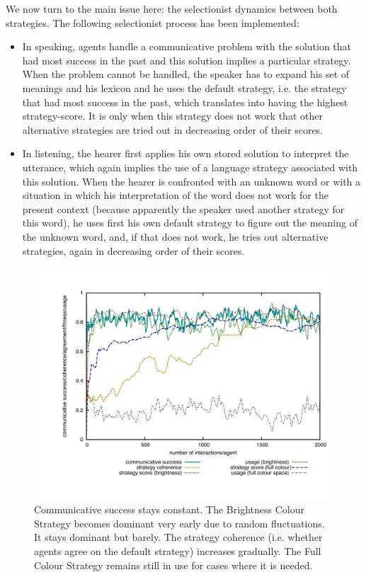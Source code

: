 We now turn to the main issue here: the
selectionist dynamics between both strategies. The following selectionist process has been implemented: 
\begin{itemize}
\item In speaking, agents handle a communicative problem with the solution 
that had most success in the past and this solution implies a particular strategy. 
When the problem cannot be handled, the speaker 
has to expand his set of meanings and his lexicon and he uses the default strategy, 
i.e. the strategy that had most success in the past, which translates into having the highest
strategy-score. It is only when this strategy does not work that 
other alternative strategies are tried out in decreasing order of their scores. 
\item In listening, the hearer first applies his own 
stored solution to interpret the utterance, which again implies the use of a language strategy associated
with this solution. When the hearer is confronted with an unknown word or with a situation in which 
his interpretation of the word does not work for the present context (because apparently the speaker 
used another strategy for this word), he uses first his own default 
strategy to figure out the meaning of the unknown word, and, if that does not work, he tries out alternative
strategies, again in decreasing order of their scores. 
\end{itemize}


\begin{figure}[b]
\centerline{\includegraphics[width=.9\textwidth]{chap12/figs/strategies-one-winner.pdf}}
\caption{{Communicative success stays constant. The Brightness Colour Strategy becomes 
dominant very early due to random fluctuations. It stays dominant but barely. 
The strategy coherence (i.e. whether agents agree on the 
default strategy) increases gradually. The Full Colour Strategy remains still in use for cases where
it is needed. \label{fig:strategies-one}}}
\end{figure}

